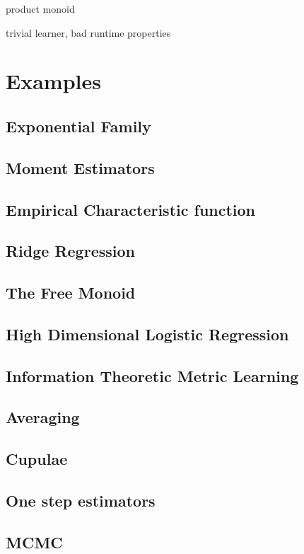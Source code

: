 \documentclass[thesis.tex]{subfiles}
\begin{document}
\begin{example}
    product monoid
\end{example}

\begin{example}
    trivial learner, bad runtime properties
\end{example}

\section{Examples}

\subsection{Exponential Family}

\subsection{Moment Estimators}

\subsection{Empirical Characteristic function}
\cite{yu2004empirical}

\subsection{Ridge Regression}

\subsection{The Free Monoid}

\subsection{High Dimensional Logistic Regression}

\subsection{Information Theoretic Metric Learning}

\subsection{Averaging}

\subsection{Cupulae}

\subsection{One step estimators}

\subsection{MCMC}
\end{document}
